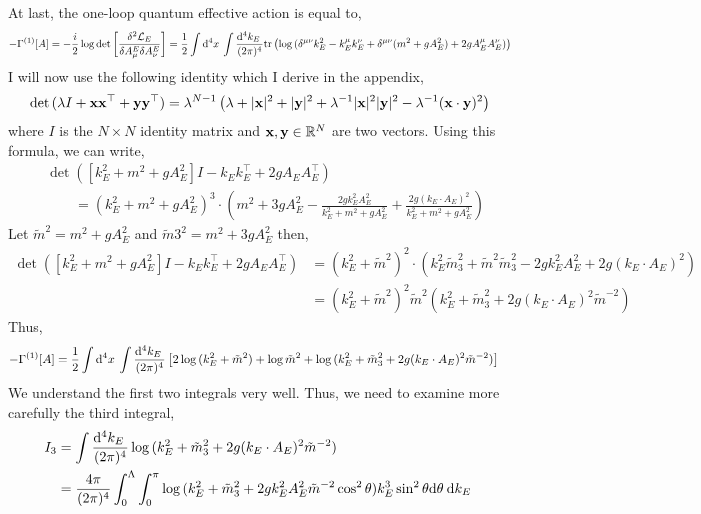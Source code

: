 \documentclass[12pt]{article}
\begin{document}
At last, the one-loop quantum effective action is equal to,
\begin{align*}
- \Gamma^{(1)}[A] = - \frac{i}{2} \log{\det{\left[ \frac{\delta^2 \lagrange_E}{\delta A^E_\mu \delta A^E_{\nu}} \right]}} = \frac{1}{2} \int \dn{4}{x} \int \frac{\dn{4}{k_E}}{(2 \pi)^4} \tr{\log{( \delta^{\mu \nu} k_E^2 - k_E^\mu k_E^\nu + \delta^{\mu \nu} (m^2 + g A_E^2) + 2 g A^\mu_E A^{\nu}_E)}}
\end{align*}
I will now use the following identity which I derive in the appendix,
\[ \det{(\lambda I + \bf{x} \bf{x}^\top + \bf{y} \bf{y}^\top)} = \lambda^{N - 1} \left( \lambda + |\bf{x}|^2 + |\bf{y}|^2 + \lambda^{-1} |\bf{x}|^2 |\bf{y}|^2 - \lambda^{-1} (\bf{x} \cdot \bf{y})^2 \right) \]
where $I$ is the $N \times N$ identity matrix and $\bf{x}, \bf{y} \in \R^N$ are two vectors. Using this formula, we can write,
\begin{align*}
& \det{([k_E^2 + m^2 + g A_E^2] I - k_E k_E^\top + 2 g A_E A_E^\top)}
\\
& \quad \quad  = (k_E^2 + m^2 + g A_E^2)^3 \cdot \left( m^2 + 3 g A_E^2 - \frac{2 g k_E^2 A_E^2}{k_E^2 + m^2 + g A_E^2} + \frac{2g (k_E \cdot A_E)^2}{k_E^2 + m^2 + g A_E^2}  \right)  
\end{align*}
Let $\tilde{m}^2 = m^2 + g A_E^2$ and $\tilde{m}3^2 = m^2 + 3 g A_E^2$ then,
\begin{align*}
\det{([k_E^2 + m^2 + g A_E^2] I - k_E k_E^\top + 2 g A_E A_E^\top)} & = (k_E^2 + \tilde{m}^2)^2 \cdot \left( k_E^2 \tilde{m}_3^2 + \tilde{m}^2 \tilde{m}_3^2 - 2 g k_E^2 A_E^2 + 2g (k_E \cdot A_E)^2 \right)  
\\
& = (k_E^2 + \tilde{m}^2)^2 \tilde{m}^2 \left( k_E^2 + \tilde{m}_3^2 + 2 g (k_E \cdot A_E)^2 \tilde{m}^{-2} \right)
\end{align*}
Thus,
\begin{align*}
- \Gamma^{(1)}[A] & = \frac{1}{2} \int \dn{4}{x} \int \frac{\dn{4}{k_E}}{(2 \pi)^4} \left[ 2 \log{(k_E^2 + \tilde{m}^2)} + \log{\tilde{m}^2} + \log{(k_E^2 + \tilde{m}_3^2 + 2 g (k_E \cdot A_E)^2 \tilde{m}^{-2})} \right]
\end{align*}
We understand the first two integrals very well. Thus, we need to examine more carefully the third integral,
\begin{align*}
I_3 & = \int \frac{\dn{4}{k_E}}{(2 \pi)^4} \log{(k_E^2 + \tilde{m}_3^2 + 2 g (k_E \cdot A_E)^2 \tilde{m}^{-2})} 
\\
& = \frac{4 \pi}{(2 \pi)^4} \int_0^{\Lambda} \int_0^{\pi} \log{(k_E^2 + \tilde{m}_3^2 + 2 g k_E^2 A_E^2 \tilde{m}^{-2} \cos^2{\theta})}  k_E^3 \sin^2{\theta} \d{\theta} \d{k_E} 
\end{align*}
\end{document}
